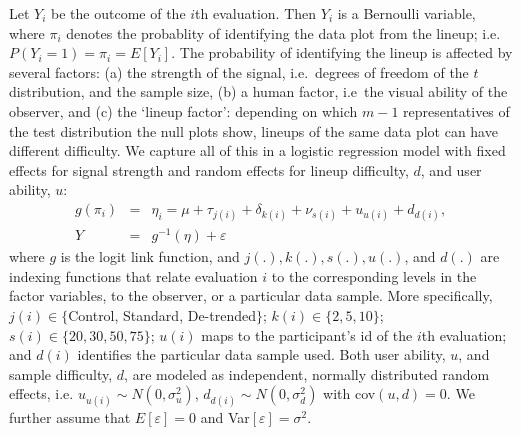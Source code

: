\documentclass{article}\usepackage[]{graphicx}\usepackage[]{color}
\begin{document}
Let $Y_i$ be the outcome of the $i$th evaluation. Then $Y_i$ is a Bernoulli variable, where $\pi_i$ denotes the probablity of identifying the data plot from the lineup; i.e.~$P(Y_i = 1) = \pi_i = E[Y_i]$.   
The probability of identifying the lineup is affected by several factors: (a) the strength of the signal, i.e.~degrees of freedom of the $t$ distribution, and the sample size, (b) a human factor, i.e~the visual ability of the observer, and (c)  the `lineup factor': depending on which $m-1$ representatives of the test distribution the null plots show, lineups of the same data plot can have different difficulty. We capture all of this in a logistic regression model with fixed effects for signal strength and random effects for lineup difficulty, $d$, and user ability, $u$: 
\begin{eqnarray*}
g(\pi_i) &=& \eta_i = \mu + \tau_{j(i)} +\delta_{k(i)}+ \nu_{s(i)} + u_{u(i)} + d_{d(i)},\\
Y &=& g^{-1}(\eta) + \varepsilon
\end{eqnarray*}
where $g$ is the logit link function, and $j(.), k(.), s(.), u(.)$, and $d(.)$ are  indexing functions that relate evaluation $i$ to the corresponding levels in the factor variables, to the observer, or a particular data sample. More specifically, $j(i) \in \{$Control, Standard, De-trended$\}$; $k(i) \in \{2,5,10\}$; $s(i) \in \{20, 30, 50, 75\}$; $u(i)$ maps to the participant's id of the $i$th evaluation; and $d(i)$ identifies the particular data sample used. 
Both user ability, $u$, and sample difficulty, $d$, are modeled as independent, normally distributed  random effects, i.e. $u_{u(i)} \sim N(0, \sigma_u^2)$, $d_{d(i)} \sim N(0,\sigma_d^2)$ with cov$(u, d) = 0$. We further assume that $E[\varepsilon] = 0$ and Var$[\varepsilon]=\sigma^2$.




\end{document}
